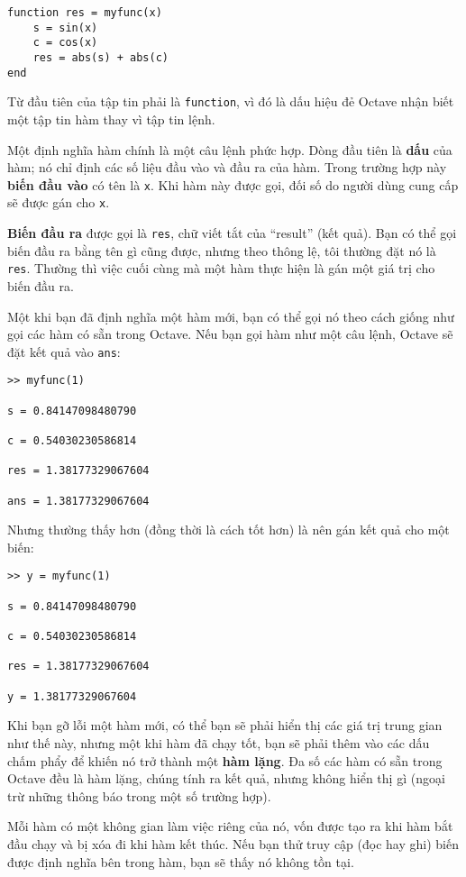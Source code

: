 \documentclass[12pt]{book}
\begin{document}
\begin{verbatim}
function res = myfunc(x)
    s = sin(x)
    c = cos(x)
    res = abs(s) + abs(c)
end
\end{verbatim}
%
Từ đầu tiên của tập tin phải là {\tt function}, vì đó là dấu hiệu đẻ
Octave nhận biết một tập tin hàm thay vì tập tin lệnh.

Một định nghĩa hàm chính là một câu lệnh phức hợp. Dòng đầu tiên là
{\bf dấu} của hàm; nó chỉ định các số liệu đầu vào và đầu ra của hàm. 
Trong trường hợp này {\bf biến đầu vào} có tên là {\tt x}. Khi hàm này
được gọi, đối số do người dùng cung cấp sẽ được gán cho {\tt x}.

{\bf Biến đầu ra} được gọi là {\tt res}, chữ viết tắt của ``result''
(kết quả). Bạn có thể gọi biến đầu ra bằng tên gì cũng được, nhưng
theo thông lệ, tôi thường đặt nó là {\tt res}.  Thường thì việc cuối
cùng mà một hàm thực hiện là gán một giá trị cho biến đầu ra.

Một khi bạn đã định nghĩa một hàm mới, bạn có thể gọi nó theo cách
giống như gọi các hàm có sẵn trong Octave. Nếu bạn gọi hàm như một
câu lệnh, Octave sẽ đặt kết quả vào {\tt ans}:

\begin{verbatim}
>> myfunc(1)

s = 0.84147098480790

c = 0.54030230586814

res = 1.38177329067604

ans = 1.38177329067604
\end{verbatim}
%
Nhưng thường thấy hơn (đồng thời là cách tốt hơn) là nên gán 
kết quả cho một biến:

\begin{verbatim}
>> y = myfunc(1)

s = 0.84147098480790

c = 0.54030230586814

res = 1.38177329067604

y = 1.38177329067604
\end{verbatim}
%
Khi bạn gỡ lỗi một hàm mới, có thể bạn sẽ phải hiển thị các
giá trị trung gian như thế này, nhưng một khi hàm đã chạy tốt, bạn
sẽ phải thêm vào các dấu chấm phẩy để khiến nó trở thành một 
{\bf hàm lặng}. Đa số các hàm có sẵn trong Octave đều là hàm lặng,
chúng tính ra kết quả, nhưng không hiển thị gì (ngoại trừ những
thông báo trong một số trường hợp).

Mỗi hàm có một không gian làm việc riêng của nó, vốn được tạo ra khi
hàm bắt đầu chạy và bị xóa đi khi hàm kết thúc. Nếu bạn thử 
truy cập (đọc hay ghi) biến được định nghĩa bên trong hàm, bạn sẽ
thấy nó không tồn tại.
\end{document}
